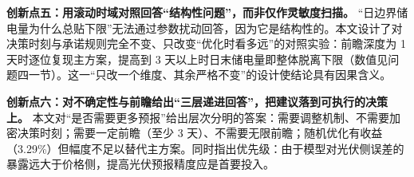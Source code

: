 \textbf{创新点五：用滚动时域对照回答“结构性问题”，而非仅作灵敏度扫描。} “日边界储电量为什么总贴下限”无法通过参数扰动回答，因为它是结构性的。本文设计了对决策时刻与承诺规则完全不变、只改变“优化时看多远”的对照实验：前瞻深度为 1 天时逐位复现主方案，提高到 3 天以上时日末储电量即整体脱离下限（数值见问题四一节）。这一“只改一个维度、其余严格不变”的设计使结论具有因果含义。

\textbf{创新点六：对不确定性与前瞻给出“三层递进回答”，把建议落到可执行的决策上。} 本文对“是否需要更多预报”给出层次分明的答案：需要调整机制、不需要加密决策时刻；需要一定前瞻（至少 3 天）、不需要无限前瞻；随机优化有收益（3.29\%）但幅度不足以替代主方案。同时指出优先级：由于模型对光伏侧误差的暴露远大于价格侧，提高光伏预报精度应是首要投入。
